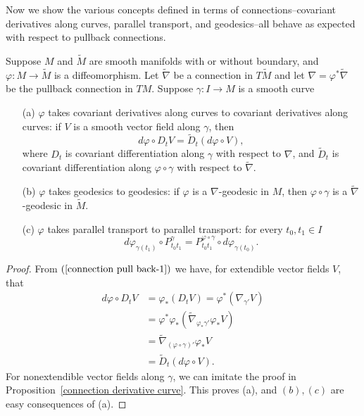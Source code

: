 Now we show the various concepts defined in terms of connections--covariant derivatives along curves, parallel transport, and geodesics--all behave as expected with respect to pullback connections.
\begin{proposition}\label{connection pull back prop}
Suppose $M$ and $\widetilde{M}$ are smooth manifolds with or without boundary, and $\varphi:M\to\widetilde{M}$ is a diffeomorphism. Let $\widetilde{\nabla}$ be a connection in $T\widetilde{M}$ and let $\nabla=\varphi^*\widetilde{\nabla}$ be the pullback connection in $TM$. Suppose $\gamma:I\to M$ is a smooth curve
\begin{itemize}
\item[(a)] $\varphi$ takes covariant derivatives along curves to covariant derivatives along curves: if $V$ is a smooth vector field along $\gamma$, then
\[d\varphi\circ D_tV=\widetilde{D}_t(d\varphi\circ V),\]
where $D_t$ is covariant differentiation along $\gamma$ with respect to $\nabla$, and $\widetilde{D}_t$ is covariant differentiation along $\varphi\circ\gamma$ 
with respect to $\widetilde{\nabla}$.
\item[(b)] $\varphi$ takes geodesics to geodesics: if $\varphi$ is a $\nabla$-geodesic in $M$, then $\varphi\circ\gamma$ is a $\widetilde{\nabla}$-geodesic in $\widetilde{M}$.
\item[(c)] $\varphi$ takes parallel transport to parallel transport: for every $t_0,t_1\in I$
\[d\varphi_{\gamma(t_1)}\circ P_{t_0t_1}^\gamma=P^{\varphi\circ\gamma}_{t_0t_1}\circ d\varphi_{\gamma(t_0)}.\] 
\end{itemize}
\end{proposition}
\begin{proof}
From $(\ref{connection pull back-1})$ we have, for extendible vector fields $V$, that
\begin{align*}
d\varphi\circ D_tV&=\varphi_*(D_tV)=\varphi^*(\nabla_{\gamma'}V)\\
&=\varphi^*\varphi_*(\widetilde{\nabla}_{\varphi_*\gamma'}\varphi_*V)\\
&=\widetilde{\nabla}_{(\varphi\circ\gamma)'}\varphi_*V\\
&=\widetilde{D}_t(d\varphi\circ V).
\end{align*}
For nonextendible vector fields along $\gamma$, we can imitate the proof in Proposition~\ref{connection derivative curve}. This proves (a), and $(b),(c)$ 
are easy consequences of (a).
\end{proof}
